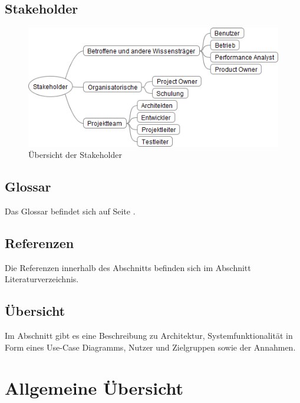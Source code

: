 \subsection{Stakeholder}
 \begin{figure}[H]
        	\caption{Übersicht der Stakeholder}
  	\centering
    	\includegraphics[width=15cm]{images/stakeholder_analyse}
\end{figure}

\subsection{Glossar}
Das Glossar befindet sich auf Seite \pageref{glossar}. 
\subsection{Referenzen}
Die Referenzen innerhalb des Abschnitts  befinden sich im Abschnitt Literaturverzeichnis.
\subsection{Übersicht}
Im Abschnitt  gibt es eine Beschreibung zu Architektur, Systemfunktionalität in Form eines Use-Case Diagramms, Nutzer und Zielgruppen sowie der Annahmen. 

\section{Allgemeine Übersicht}\label{allgemeine_uebersicht}
